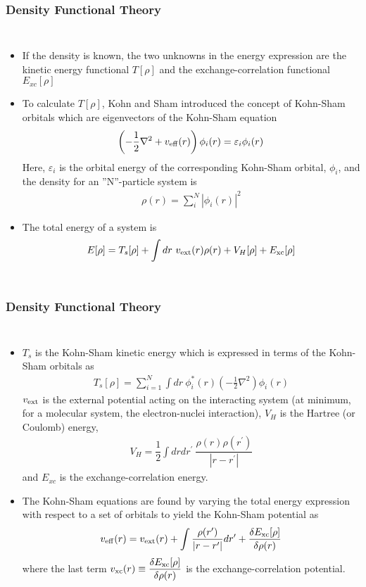 \documentclass[slidestop,mathserif,compress,xcolor=svgnames]{beamer}
\begin{document}
\begin{frame}
\frametitle{\small Density Functional Theory}
\footnotesize{
\begin{columns}
\column{12cm}
\begin{itemize}
\item If the density is known, the two unknowns in the energy expression are the kinetic energy functional $T[\rho]$ and the exchange-correlation functional $E_{xc}[\rho]$
\item To calculate $T[\rho]$, Kohn and Sham introduced the concept of Kohn-Sham orbitals which are eigenvectors of the Kohn-Sham equation 
\begin{align*}
\left(-\dfrac{1}{2}\nabla^2+v_{\rm eff}(r)\right)\phi_{i}(r)=\varepsilon_{i}\phi_{i}(r)
\end{align*}
Here, $\varepsilon_i$ is the orbital energy of the corresponding Kohn-Sham orbital, $\phi_i$, and the density for an ''N''-particle system is
\begin{align*}
\rho(r)=\sum_i^N |\phi_{i}(r)|^2
\end{align*}
\item The total energy of a system is 
\begin{align*}
E[\rho]  = T_s[\rho] + \int dr\ v_{\rm ext}(r)\rho(r) + V_{H}[\rho] + E_{\rm xc}[\rho]
\end{align*}
\end{itemize}
\end{columns}
}
\end{frame}
\begin{frame}
\frametitle{\small Density Functional Theory}
\scriptsize{
\vspace{-0.5cm}
\begin{columns}
\column{12cm}
\begin{itemize}
\item $T_s$ is the Kohn-Sham kinetic energy which is expressed in terms of the Kohn-Sham orbitals as
\begin{align*}
T_s[\rho]=\sum_{i=1}^N\int dr\ \phi_i^*(r)\left(-\frac{1}{2}\nabla^2\right)\phi_i(r)
\end{align*}
$v_{\rm ext}$ is the external potential acting on the interacting system (at minimum, for a molecular system, the electron-nuclei interaction), $V_H$ is the Hartree (or Coulomb) energy,
\begin{align*}
 V_{H}=\dfrac{1}{2}\int drdr^\prime\  \dfrac{\rho(r)\rho(r^\prime)}{|r-r^\prime|}
\end{align*}
and $E_{xc}$ is the exchange-correlation energy. 
\item The Kohn-Sham equations are found by varying the total energy expression with respect to a set of orbitals to yield the Kohn-Sham potential as
\begin{align*}
v_{\rm eff}(r) = v_{\rm ext}(r) + \int \dfrac{\rho(r^\prime)}{|r-r^\prime|}dr^\prime + \dfrac{\delta E_{\rm xc}[\rho]}{\delta\rho(r)}
\end{align*}where the last term
$\displaystyle{v_{\rm xc}(r)\equiv\dfrac{\delta E_{\rm xc}[\rho]}{\delta\rho(r)}}$
is the exchange-correlation potential. 
\end{itemize}
\end{columns}
}
\end{frame}
\end{document}
